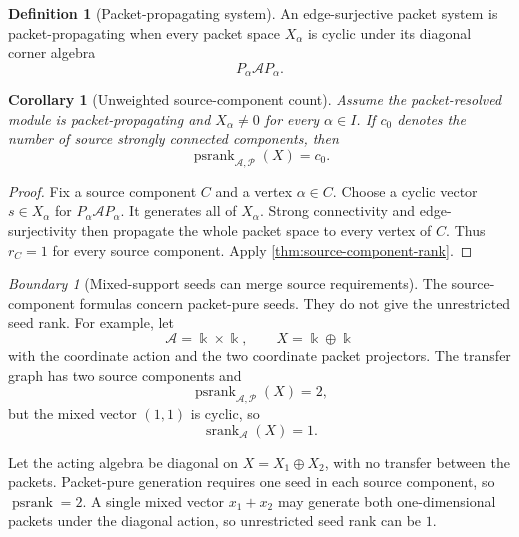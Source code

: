 \documentclass[11pt]{article}
\newtheorem{corollary}[corollary]{Corollary}
\theoremstyle{definition}
\newtheorem{definition}[definition]{Definition}
\theoremstyle{remark}
\newtheorem{boundary}[boundary]{Boundary}
\theoremstyle{definition}\newtheorem{example}[theorem]{Example}
\newcommand{\bbk}{\Bbbk}
\newcommand{\A}{\mathcal A}
\newcommand{\Pcal}{\mathcal P}
\newcommand{\srank}{\operatorname{srank}}
\newcommand{\psrank}{\operatorname{psrank}}
\newcommand{\RecordID}[1]{\label{record:#1}}
\newcommand{\Depends}[1]{}
\begin{document}
\begin{definition}[Packet-propagating system]
\label{def:packet-propagating}
An edge-surjective packet system is packet-propagating when every packet space $X_\alpha$ is cyclic under its diagonal corner algebra
\[
P_\alpha\A P_\alpha.
\]
\end{definition}
\RecordID{PSC-I-D-PACKET-PROPAGATING}

\begin{corollary}[Unweighted source-component count]
\label{cor:source-component-count}
Assume the packet-resolved module is packet-propagating and $X_\alpha\neq0$ for every $\alpha\in I$.  If $c_0$ denotes the number of source strongly connected components, then
\[
\boxed{
\psrank_{\A,\Pcal}(X)=c_0.
}
\]
\end{corollary}
\RecordID{PSC-I-C-SOURCE-COMPONENT-COUNT}
\Depends{PSC-I-T-SOURCE-COMPONENT-SEED-RANK.}

\begin{proof}
Fix a source component $C$ and a vertex $\alpha\in C$.  Choose a cyclic vector $s\in X_\alpha$ for $P_\alpha\A P_\alpha$.  It generates all of $X_\alpha$.  Strong connectivity and edge-surjectivity then propagate the whole packet space to every vertex of $C$.  Thus $r_C=1$ for every source component.  Apply \cref{thm:source-component-rank}.
\end{proof}

\begin{boundary}[Mixed-support seeds can merge source requirements]
\label{bnd:packet-pure-boundary}
The source-component formulas concern packet-pure seeds.  They do not give the unrestricted seed rank.  For example, let
\[
\A=\bbk\times\bbk,
\qquad
X=\bbk\oplus\bbk
\]
with the coordinate action and the two coordinate packet projectors.  The transfer graph has two source components and
\[
\psrank_{\A,\Pcal}(X)=2,
\]
but the mixed vector $(1,1)$ is cyclic, so
\[
\srank_\A(X)=1.
\]
\end{boundary}
\RecordID{PSC-I-B-PACKET-PURE-BOUNDARY}

\begin{microexample}[title={Why mixed seeds change the answer}]
Let the acting algebra be diagonal on \(X=X_1\oplus X_2\), with no transfer between the packets.  Packet-pure generation requires one seed in each source component, so \(\psrank=2\).  A single mixed vector \(x_1+x_2\) may generate both one-dimensional packets under the diagonal action, so unrestricted seed rank can be \(1\).
\end{microexample}
\end{document}
